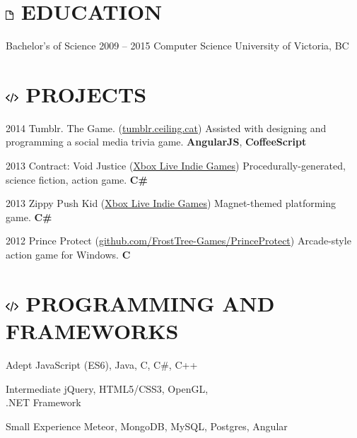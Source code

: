 \documentclass[10pt]{tccv}
\begin{document}
\section{\includegraphics[height=10pt, keepaspectratio=true]{file} EDUCATION}

\begin{yearlist}

\item[Bachelor's of Science]{2009 -- 2015}
     {Computer Science}
     {University of Victoria, BC}

\end{yearlist}

\section{\includegraphics[height=10pt, keepaspectratio=true]{code} PROJECTS}

\begin{yearlist}

\item{2014}
     {Tumblr. The Game. (\href{http://tumblr.ceiling.cat/}{tumblr.ceiling.cat})}
     {Assisted with designing and programming a social media trivia game. \textbf{AngularJS}, \textbf{CoffeeScript}}

\item{2013}
     {Contract: Void Justice (\href{http://marketplace.xbox.com/en-US/Product/Contract-Void-Justice/66acd000-77fe-1000-9115-d80258550d94}{Xbox Live Indie Games})}
     {Procedurally-generated, science fiction, action game. \textbf{C\#}}

\item{2013}
     {Zippy Push Kid (\href{http://marketplace.xbox.com/en-ca/Product/Zippy-Push-Kid/66acd000-77fe-1000-9115-d80258550cd6}{Xbox Live Indie Games})}
     {Magnet-themed platforming game. \textbf{C\#}}

\item{2012}
     {Prince Protect (\href{https://github.com/FrostTree-Games/PrinceProtect}{github.com/FrostTree-Games/PrinceProtect})}
     {Arcade-style action game for Windows. \textbf{C}}

\end{yearlist}

\section{\includegraphics[height=10pt, keepaspectratio=true]{code} PROGRAMMING AND FRAMEWORKS}

\begin{factlist}

\item{Adept}
     {JavaScript (ES6), Java, C, C\#, C++}
     
\item{Intermediate}
	 {jQuery, HTML5/CSS3, OpenGL, \\.NET Framework}

\item{Small Experience}
     {Meteor, MongoDB, MySQL, Postgres, Angular}

\end{factlist}
\end{document}
